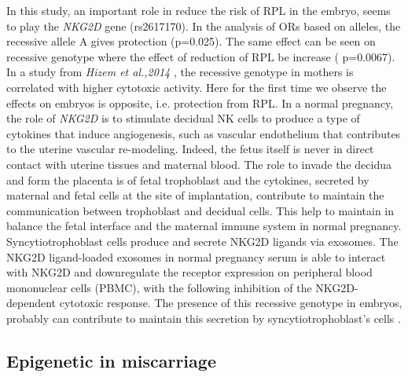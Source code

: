 \documentclass[journal,article,submit,moreauthors,pdftex]{Definitions/mdpi}
\begin{document}
\noindent In this study, an important role in reduce the risk of RPL in the embryo, seems to play the \textit{NKG2D} gene (rs2617170). In the analysis of ORs based on alleles, the recessive allele A gives protection (p=0.025). The same effect can be seen on recessive genotype where the effect of reduction of RPL be increase ( p=0.0067). In a study from \textit{Hizem et al.,2014} \cite{hizem2014polymorphisms}, the recessive genotype in mothers is correlated with higher cytotoxic activity. Here for the first time we observe the effects on embryos is opposite, i.e. protection from RPL. In a normal pregnancy, the role of \textit{NKG2D} is to stimulate decidual NK cells to produce a type of cytokines that induce angiogenesis, such as vascular endothelium that contributes to the uterine vascular re-modeling. Indeed, the fetus itself is never in direct contact with uterine tissues and maternal blood. The role to invade the decidua and form the placenta is of fetal trophoblast and the cytokines, secreted by maternal and fetal cells at the site of implantation, contribute to maintain the communication between trophoblast and decidual cells. This help to maintain in balance the fetal interface and the maternal immune system in normal pregnancy. Syncytiotrophoblast cells produce and secrete NKG2D ligands via exosomes. The NKG2D ligand-loaded exosomes in normal pregnancy serum is able to interact with NKG2D and downregulate the receptor expression on peripheral blood mononuclear cells (PBMC), with the following inhibition of the NKG2D-dependent cytotoxic response. The presence of this recessive genotype in embryos, probably can contribute to maintain this secretion by syncytiotrophoblast's cells \cite{mei2012defects}.\\

\subsection{Epigenetic in miscarriage}
\end{document}
